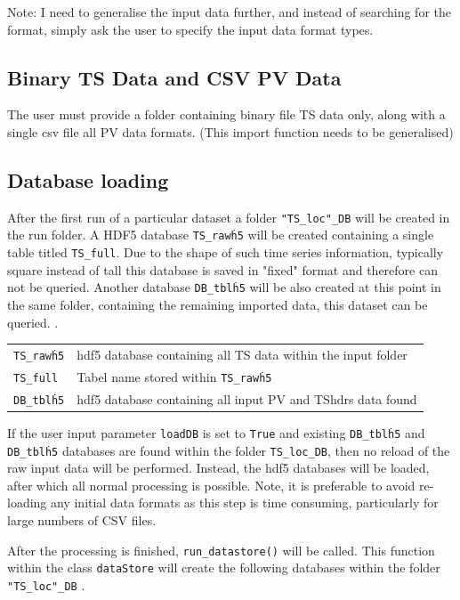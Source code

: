 \documentclass{article}
\begin{document}
Note: I need to generalise the input data further, and instead of searching for the format, simply ask the user to specify the input data format types. 

\subsection{Binary TS Data and CSV PV Data}
The user must provide a folder containing binary file TS data only, along with a single csv file all PV data formats. (This import function needs to be generalised)

\subsection{Database loading}
After the first run of a particular dataset a folder \texttt{"TS\_loc"\_DB} will be created in the run folder. A HDF5 database \texttt{TS\_raw\.h5} will be created containing a single table titled \texttt{TS\_full}. Due to the shape of such time series information, typically square instead of tall this database is saved in "fixed" format and therefore can not be queried. Another database \texttt{DB\_tbl\.h5} will be also created at this point in the same folder, containing the remaining imported data, this dataset can be queried.   \newline.

\begin{tabular}{l|p{120mm}}
\texttt{TS\_raw\.h5} & hdf5 database containing all TS data within the input folder\\
\texttt{TS\_full} & Tabel name stored within \texttt{TS\_raw\.h5}\\
\texttt{DB\_tbl\.h5} & hdf5 database containing all input PV and TShdrs data found \\
\end{tabular}
\newline

If the user input parameter \texttt{loadDB} is set to \texttt{True} and existing \texttt{DB\_tbl\.h5} and \texttt{DB\_tbl\.h5} databases are found within the folder \texttt{TS\_loc\_DB}, then no reload of the raw input data will be performed. Instead, the hdf5 databases will be loaded, after which all normal processing is possible. Note, it is preferable to avoid re-loading any initial data formats as this step is time consuming, particularly for large numbers of CSV files. \newline

After the processing is finished, \texttt{run\_datastore()} will be called. This function within the class \texttt{dataStore} will create the following databases within the folder \texttt{"TS\_loc"\_DB} . \newline
\end{document}
